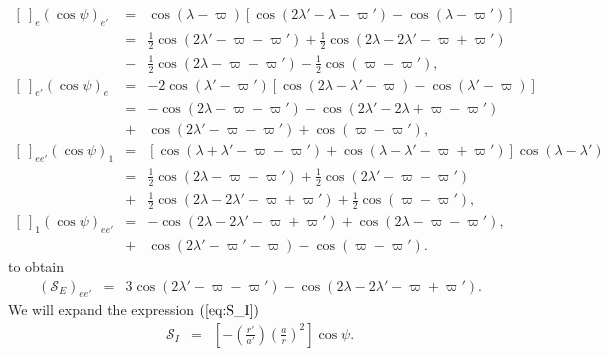 \documentclass [12pt, a4paper] {article}
\begin{document}
\begin {eqnarray}
    \left[\:\right]_{e}
    \left(\cos\psi\right)_{e'}
    &=& 
    \cos(\lambda - \varpi)
    \left[
        \cos(2\lambda' - \lambda - \varpi') - \cos(\lambda - \varpi')
    \right]
    \\
    &=& 
    \frac{1}{2}\cos(2\lambda' - \varpi - \varpi')
    +
    \frac{1}{2}\cos(2\lambda - 2\lambda' - \varpi + \varpi')
    \\\nonumber
    &-&
    \frac{1}{2}\cos(2\lambda - \varpi - \varpi')
    -
    \frac{1}{2}\cos(\varpi - \varpi'),
    \\
    \left[\:\right]_{e'}
    \left(\cos\psi\right)_{e}
    &=&
    -2\cos(\lambda' - \varpi')
    \left[
        \cos(2\lambda - \lambda' - \varpi) - \cos(\lambda' - \varpi)
    \right]
    \\
    &=& 
    -
    \cos(2\lambda - \varpi - \varpi')
    -
    \cos(2\lambda' - 2\lambda + \varpi - \varpi')
    \\\nonumber
    &+&
    \cos(2\lambda' - \varpi - \varpi')
    +
    \cos(\varpi - \varpi'),
    \\
    \left[\:\right]_{ee'}
    \left(\cos\psi\right)_{1}
    &=& 
    \left[
        \cos(\lambda + \lambda' - \varpi - \varpi') 
        + 
        \cos(\lambda - \lambda' - \varpi + \varpi')
    \right]
    \cos(\lambda - \lambda')
    \\
    &=&
    \frac{1}{2}
    \cos(2\lambda - \varpi - \varpi')
    +
    \frac{1}{2}
    \cos(2\lambda' - \varpi - \varpi')
    \\\nonumber
    &+&
    \frac{1}{2}
    \cos(2\lambda - 2\lambda' - \varpi + \varpi')
    +
    \frac{1}{2}
    \cos(\varpi - \varpi'),
    \\
    \left[\:\right]_{1}
    \left(\cos\psi\right)_{ee'}
    &=& 
    -
    \cos(2\lambda - 2\lambda' - \varpi + \varpi')
    +
    \cos(2\lambda - \varpi - \varpi'),
    \\\nonumber
    &+&
    \cos(2\lambda' - \varpi' - \varpi)
    -
    \cos(\varpi - \varpi').
\end {eqnarray}
to obtain 
\begin {eqnarray}
    (\mathcal{S}_E)_{ee'}
    &=& 
    3\cos(2\lambda' - \varpi - \varpi')
    -
    \cos(2\lambda - 2\lambda' - \varpi + \varpi').
\end {eqnarray}
We will expand the expression $(\ref{eq:S_I})$
\begin {eqnarray}
    \label{eq:S_I_repeat}
    \mathcal{S}_I 
    &=& 
    \left[
        -
        \left(
            \frac{r'}{a'}
        \right)
        \left(
            \frac{a}{r}
        \right)^2
    \right]\cos\psi.
\end {eqnarray}
\end{document}
